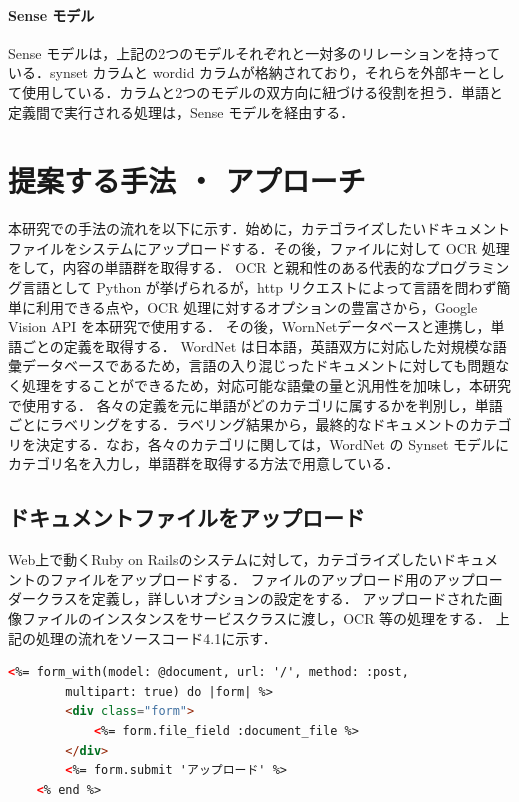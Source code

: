 \paragraph{Sense モデル}
Sense モデルは，上記の2つのモデルそれぞれと一対多のリレーションを持っている．synset カラムと wordid カラムが格納されており，それらを外部キーとして使用している．カラムと2つのモデルの双方向に紐づける役割を担う．単語と定義間で実行される処理は，Sense モデルを経由する．

\section{提案する手法 ・ アプローチ}
\label{sec:app_method}

本研究での手法の流れを以下に示す．始めに，カテゴライズしたいドキュメントファイルをシステムにアップロードする．その後，ファイルに対して OCR 処理をして，内容の単語群を取得する．
OCR と親和性のある代表的なプログラミング言語として Python が挙げられるが，http リクエストによって言語を問わず簡単に利用できる点や，OCR 処理に対するオプションの豊富さから，Google Vision API を本研究で使用する．
その後，WornNetデータベースと連携し，単語ごとの定義を取得する． WordNet は日本語，英語双方に対応した対規模な語彙データベースであるため，言語の入り混じったドキュメントに対しても問題なく処理をすることができるため，対応可能な語彙の量と汎用性を加味し，本研究で使用する．
各々の定義を元に単語がどのカテゴリに属するかを判別し，単語ごとにラベリングをする．ラベリング結果から，最終的なドキュメントのカテゴリを決定する．なお，各々のカテゴリに関しては，WordNet の Synset モデルにカテゴリ名を入力し，単語群を取得する方法で用意している．


\subsection{ドキュメントファイルをアップロード}
\label{subsec:app_upload}

Web上で動くRuby on Railsのシステムに対して，カテゴライズしたいドキュメントのファイルをアップロードする．
ファイルのアップロード用のアップローダークラスを定義し，詳しいオプションの設定をする．
アップロードされた画像ファイルのインスタンスをサービスクラスに渡し，OCR 等の処理をする．
上記の処理の流れをソースコード4.1に示す．

\begin{lstlisting}[language=HTML, caption=フロントエンドの ERB]
    <%= form_with(model: @document, url: '/', method: :post,
        multipart: true) do |form| %>
        <div class="form">
            <%= form.file_field :document_file %>
        </div>
        <%= form.submit 'アップロード' %>
    <% end %>
\end{lstlisting}


